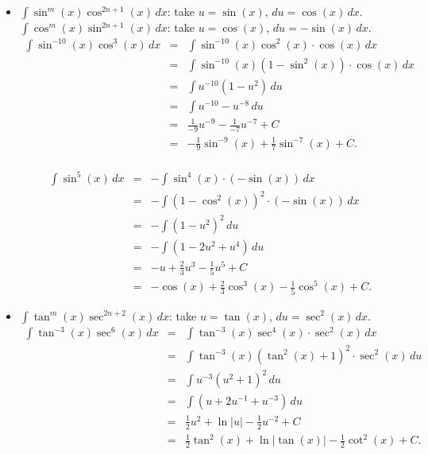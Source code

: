 \documentclass[11pt]{article}
\begin{document}
\begin{itemize}
\item[(a)] $\int  \sin^{m}(x) \cos^{2n+1}(x) \,dx$:
take $u=\sin(x)$, $du=\cos(x)\,dx$. \\
$\int\cos^{m}(x) \sin^{2n+1}(x)\,dx$:
take $u=\cos(x)$, $du=-\sin(x)\,dx$.  
$$\begin{array}{rcl}
\int\sin^{-10}(x) \cos^{3}(x)\,dx 
&=&
\int \sin^{-10}(x)\cos^{2}(x)\cdot \cos(x)\,dx
\\[.5em]&=&
\int \sin^{-10}(x)(1-\sin^2(x))\cdot \cos(x)\,dx
\\[.5em]
&=&
\int u^{-10}(1-u^2) \,du
\\[.5em]
&=&
\int u^{-10}-u^{-8} \,du
\\[.5em]
&=&
\tfrac{1}{-9}u^{-9} - \tfrac{1}{-7}u^{-7}+C
\\[.5em]
&=&
-\tfrac{1}{9}\sin^{-9}(x) + \tfrac{1}{7}\sin^{-7}(x)+C.
\end{array}$$
\\[-.9em]
$$\begin{array}{rcl}
\int \sin^{5}(x)\,dx 
&=&
-\int \sin^{4}(x)\cdot (-\sin(x))\,dx
\\[.5em]&=&
-\int (1-\cos^2(x))^2\cdot (-\sin(x))\,dx
\\[.5em]
&=&
-\int (1-u^2)^2 \,du
\\[.5em]
&=&
-\int (1-2u^2+u^4)\,du
\\[.5em]
&=&
-u + \tfrac23 u^3 - \tfrac1{5}u^{5}+C
\\[.5em]
&=&
-\cos(x) + \tfrac23\cos^{3}(x) - \tfrac1{5}\cos^{5}(x)+C.
\end{array}$$

\item[(b)] $\int \tan^{m}(x)\sec^{2n+2}(x)\,dx$: 
take $u=\tan(x)$, $du=\sec^2(x)\,dx$. 
$$\begin{array}{rcl}
\int \tan^{-3}(x)\sec^{6}(x)\,dx 
&=&
\int \tan^{-3}(x)\sec^{4}(x)\cdot \sec^2(x)\,dx 
\\[.5em]
&=&
\int \tan^{-3}(x)(\tan^2(x)+1)^2 \cdot \sec^2(x)\,du
\\[.5em]
&=&
\int u^{-3}(u^2+1)^2\,du
\\[.5em]
&=&
\int (u+2u^{-1}+u^{-3})\,du
\\[.5em]
&=&
\tfrac12 u^2 + \ln\!|u| - \tfrac12 u^{-2}+C
\\[.5em]
&=&
\tfrac12 \tan^2(x) +\ln|\!\tan(x)| -\tfrac12 \cot^2(x)+C.
\end{array}$$
 
\end{itemize}
\end{document}
